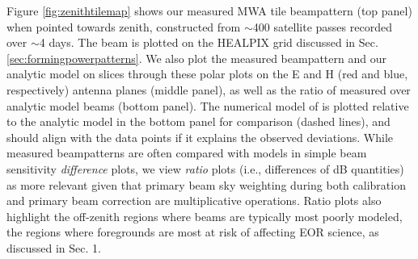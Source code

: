 Figure \ref{fig:zenithtilemap} shows our measured MWA tile beampattern (top panel) when pointed towards zenith, constructed from $\sim$400 satellite passes recorded over $\sim$4 days. The beam is plotted on the HEALPIX grid discussed in Sec. \ref{sec:formingpowerpatterns}. We also plot the measured beampattern and our analytic model on slices through these polar plots on the E and H (red and blue, respectively) antenna planes (middle panel), as well as the ratio of measured over analytic model beams (bottom panel). The numerical model of \citet{sutinjo15} is plotted relative to the analytic model in the bottom panel for comparison (dashed lines), and should align with the data points if it explains the observed deviations. While measured beampatterns are often compared with models in simple beam sensitivity \textit{difference} plots, we view \textit{ratio} plots (i.e., differences of dB quantities) as more relevant given that primary beam sky weighting during both calibration and primary beam correction are multiplicative operations. Ratio plots also highlight the off-zenith regions where beams are typically most poorly modeled, the regions where foregrounds are most at risk of affecting EOR science, as discussed in Sec. 1.

